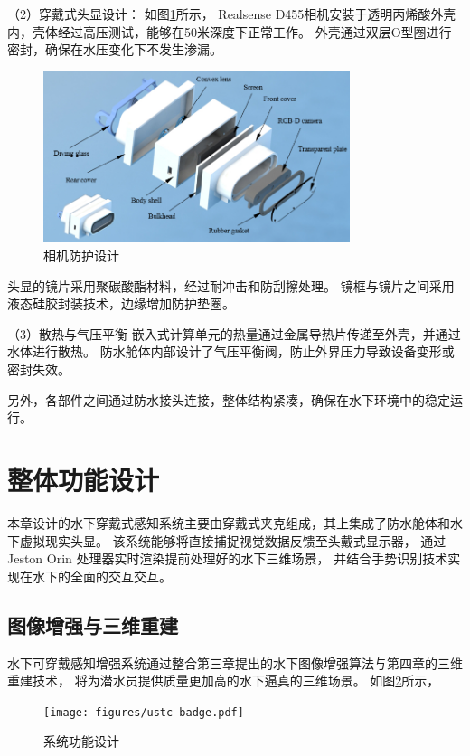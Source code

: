 （2）穿戴式头显设计：
如图\ref{img:camera}所示，
Realsense D455相机安装于透明丙烯酸外壳内，壳体经过高压测试，能够在50米深度下正常工作。
外壳通过双层O型圈进行密封，确保在水压变化下不发生渗漏。
\begin{figure}
    \centering
    \includegraphics[width=0.8\textwidth]{figures/ch5/headscreen.jpg}
    \caption{相机防护设计}
    \label{img:camera}
\end{figure}

头显的镜片采用聚碳酸酯材料，经过耐冲击和防刮擦处理。
镜框与镜片之间采用液态硅胶封装技术，边缘增加防护垫圈。

（3）散热与气压平衡
嵌入式计算单元的热量通过金属导热片传递至外壳，并通过水体进行散热。
防水舱体内部设计了气压平衡阀，防止外界压力导致设备变形或密封失效。

另外，各部件之间通过防水接头连接，整体结构紧凑，确保在水下环境中的稳定运行。

\section{整体功能设计}
本章设计的水下穿戴式感知系统主要由穿戴式夹克组成，其上集成了防水舱体和水下虚拟现实头显。
该系统能够将直接捕捉视觉数据反馈至头戴式显示器，
通过 Jeston Orin 处理器实时渲染提前处理好的水下三维场景，
并结合手势识别技术实现在水下的全面的交互交互。

\subsection{图像增强与三维重建}
水下可穿戴感知增强系统通过整合第三章提出的水下图像增强算法与第四章的三维重建技术，
将为潜水员提供质量更加高的水下逼真的三维场景。
如图\ref{img:function}所示，
\begin{figure}
    \centering
    \texttt{[image: figures/ustc-badge.pdf]}
    \caption{系统功能设计}
    \label{img:function}
\end{figure}

